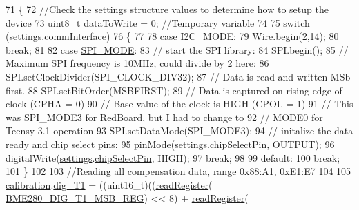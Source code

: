\begin{DoxyCode}
71 \{
72     \textcolor{comment}{//Check the settings structure values to determine how to setup the device}
73     uint8\_t dataToWrite = 0;  \textcolor{comment}{//Temporary variable}
74 
75     \textcolor{keywordflow}{switch} (\hyperlink{class_b_m_e280_af06253eb2f8ad4b5fabb858bc4a973bf}{settings}.\hyperlink{struct_sensor_settings_a5bf116387c543a6ea5732976424e8cb1}{commInterface})
76     \{
77 
78     \textcolor{keywordflow}{case} \hyperlink{_cool_spark_fun_b_m_e280_8h_a5cd01756030509b764d43a2b8c94fce8}{I2C\_MODE}:
79         Wire.begin(2,14);
80         \textcolor{keywordflow}{break};
81 
82     \textcolor{keywordflow}{case} \hyperlink{_cool_spark_fun_b_m_e280_8h_ab1dcc9464e3fcb94922386e8a7f53f21}{SPI\_MODE}:
83         \textcolor{comment}{// start the SPI library:}
84         SPI.begin();
85         \textcolor{comment}{// Maximum SPI frequency is 10MHz, could divide by 2 here:}
86         SPI.setClockDivider(SPI\_CLOCK\_DIV32);
87         \textcolor{comment}{// Data is read and written MSb first.}
88         SPI.setBitOrder(MSBFIRST);
89         \textcolor{comment}{// Data is captured on rising edge of clock (CPHA = 0)}
90         \textcolor{comment}{// Base value of the clock is HIGH (CPOL = 1)}
91         \textcolor{comment}{// This was SPI\_MODE3 for RedBoard, but I had to change to}
92         \textcolor{comment}{// MODE0 for Teensy 3.1 operation}
93         SPI.setDataMode(SPI\_MODE3);
94         \textcolor{comment}{// initalize the  data ready and chip select pins:}
95         pinMode(\hyperlink{class_b_m_e280_af06253eb2f8ad4b5fabb858bc4a973bf}{settings}.\hyperlink{struct_sensor_settings_abe2de606ebb580ad81e3fafb1a454580}{chipSelectPin}, OUTPUT);
96         digitalWrite(\hyperlink{class_b_m_e280_af06253eb2f8ad4b5fabb858bc4a973bf}{settings}.\hyperlink{struct_sensor_settings_abe2de606ebb580ad81e3fafb1a454580}{chipSelectPin}, HIGH);
97         \textcolor{keywordflow}{break};
98 
99     \textcolor{keywordflow}{default}:
100         \textcolor{keywordflow}{break};
101     \}
102 
103     \textcolor{comment}{//Reading all compensation data, range 0x88:A1, 0xE1:E7}
104     
105     \hyperlink{class_b_m_e280_aa7a28484b6f5eb6f43261ea25016fbf8}{calibration}.\hyperlink{struct_sensor_calibration_a044a8c40e958b1cda3fb85b95303550e}{dig\_T1} = ((uint16\_t)((\hyperlink{class_b_m_e280_a1bbd14c8591966df531e40085342ff71}{readRegister}(
      \hyperlink{_cool_spark_fun_b_m_e280_8h_ab41e00320fc3817544911020c4892ce9}{BME280\_DIG\_T1\_MSB\_REG}) << 8) + \hyperlink{class_b_m_e280_a1bbd14c8591966df531e40085342ff71}{readRegister}(

\end{DoxyCode}

